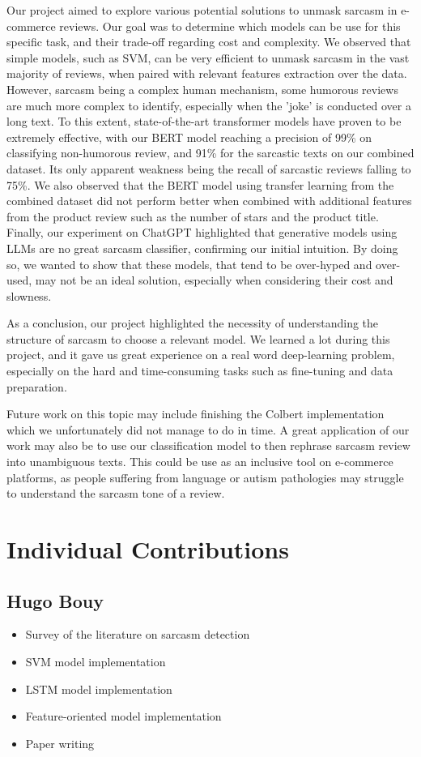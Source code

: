 \documentclass[10pt,twocolumn,letterpaper]{article}
\begin{document}
Our project aimed to explore various potential solutions to unmask sarcasm in e-commerce reviews.
Our goal was to determine which models can be use for this specific task, and their trade-off regarding cost and complexity.
We observed that simple models, such as SVM, can be very efficient to unmask sarcasm in the vast majority of reviews, when paired with relevant features extraction over the data.
However, sarcasm being a complex human mechanism, some humorous reviews are much more complex to identify, especially when the 'joke' is conducted over a long text.
To this extent, state-of-the-art transformer models have proven to be extremely effective, with our BERT model reaching a precision of 99\% on classifying non-humorous review, and 91\% for the sarcastic texts on our combined dataset.
Its only apparent weakness being the recall of sarcastic reviews falling to 75\%.
We also observed that the BERT model using transfer learning from the combined dataset did not perform better when combined with additional features from the product review such as the number of stars and the product title.
Finally, our experiment on ChatGPT highlighted that generative models using LLMs are no great sarcasm classifier, confirming our initial intuition.
By doing so, we wanted to show that these models, that tend to be over-hyped and over-used, may not be an ideal solution, especially when considering their cost and slowness.

As a conclusion, our project highlighted the necessity of understanding the structure of sarcasm to choose a relevant model.
We learned a lot during this project, and it gave us great experience on a real word deep-learning problem, especially on the hard and time-consuming tasks such as fine-tuning and data preparation.

Future work on this topic may include finishing the Colbert implementation which we unfortunately did not manage to do in time.
A great application of our work may also be to use our classification model to then rephrase sarcasm review into unambiguous texts.
This could be use as an inclusive tool on e-commerce platforms, as people suffering from language or autism pathologies may struggle to understand the sarcasm tone of a review.

\section{Individual Contributions}

\subsection{Hugo Bouy}
\begin{itemize}
    \item Survey of the literature on sarcasm detection
    \item SVM model implementation
    \item LSTM model implementation
    \item Feature-oriented model implementation
    \item Paper writing
\end{itemize}
\end{document}
